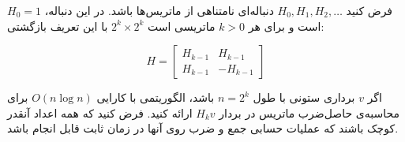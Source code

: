 \documentclass[]{article}
\begin{document}
فرض کنید
$H_0, H_1, H_2, \ldots$
دنباله‌ای نامتناهی از ماتریس‌ها باشد. در این دنباله،
$H_0 = 1$
است و برای هر
$k > 0$
ماتریسی است
$2^k \times 2^k$
با این تعریف بازگشتی:

$$
H = 
\left[
\begin{matrix}
    H_{k-1} & H_{k-1} \\
    H_{k-1} & -H_{k-1}
\end{matrix}  
\right]
$$

اگر
$v$
برداری ستونی با طول
$n=2^k$
باشد، الگوریتمی با کارایی
$O(n\log n)$
برای محاسبه‌ی حاصل‌ضرب ماتریس در بردار
$H_k v$
ارائه کنید. فرض کنید که همه اعداد
آنقدر کوچک باشند که عملیات حسابی جمع
و ضرب روی آنها در زمان ثابت قابل انجام باشد.
\end{document}
